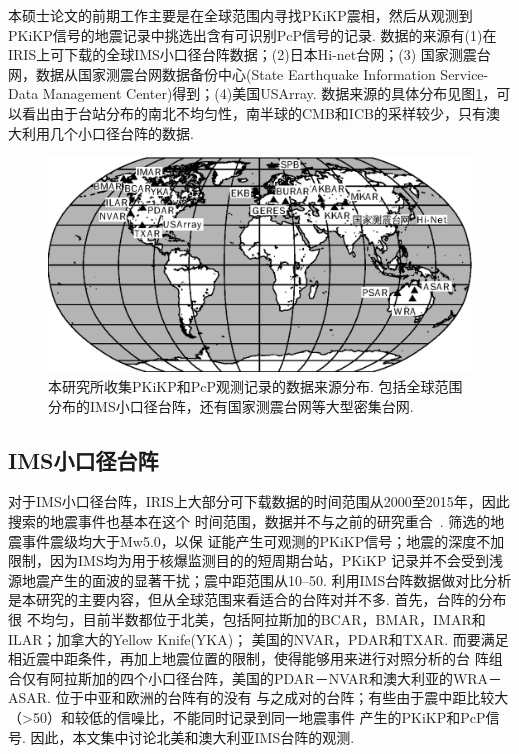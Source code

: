 本硕士论文的前期工作主要是在全球范围内寻找PKiKP震相，然后从观测到PKiKP信号的地震记录中挑选出含有可识别PcP信号的记录. 数据的来源有(1)在IRIS上可下载的全球IMS小口径台阵数据；(2)日本Hi-net台网；(3)
国家测震台网，数据从国家测震台网数据备份中心(State Earthquake Information Service-Data Management Center)得到；(4)美国USArray. 数据来源的具体分布见图\ref{fig:data_source}，可以看出由于台站分布的南北不均匀性，南半球的CMB和ICB的采样较少，只有澳大利用几个小口径台阵的数据. 

\begin{figure}
\centering
\includegraphics[width=0.8\linewidth]{fig/chap2/data_source}
\caption{本研究所收集PKiKP和PcP观测记录的数据来源分布. 包括全球范围分布的IMS小口径台阵，还有国家测震台网等大型密集台网. }
\label{fig:data_source}
\end{figure}

\subsection{IMS小口径台阵}

对于IMS小口径台阵，IRIS上大部分可下载数据的时间范围从2000至2015年，因此搜索的地震事件也基本在这个
时间范围，数据并不与之前的研究重合~\citep{Koper2004a}. 筛选的地震事件震级均大于Mw5.0，以保
证能产生可观测的PKiKP信号；地震的深度不加限制，因为IMS均为用于核爆监测目的的短周期台站，PKiKP
记录并不会受到浅源地震产生的面波的显著干扰；震中距范围从10{\textdegree}--50{\textdegree}. 利用IMS台阵数据做对比分析是本研究的主要内容，但从全球范围来看适合的台阵对并不多. 首先，台阵的分布很
不均匀，目前半数都位于北美，包括阿拉斯加的BCAR，BMAR，IMAR和ILAR；加拿大的Yellow Knife(YKA)；
美国的NVAR，PDAR和TXAR. 而要满足相近震中距条件，再加上地震位置的限制，使得能够用来进行对照分析的台
阵组合仅有阿拉斯加的四个小口径台阵，美国的PDAR－NVAR和澳大利亚的WRA－ASAR. 位于中亚和欧洲的台阵有的没有
与之成对的台阵；有些由于震中距比较大（>50{\textdegree}）和较低的信噪比，不能同时记录到同一地震事件
产生的PKiKP和PcP信号. 因此，本文集中讨论北美和澳大利亚IMS台阵的观测. 

